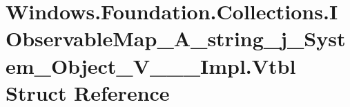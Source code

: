 \hypertarget{struct_windows_1_1_foundation_1_1_collections_1_1_i_observable_map___a__string__j___system___object___v_______impl_1_1_vtbl}{}\section{Windows.\+Foundation.\+Collections.\+I\+Observable\+Map\+\_\+\+A\+\_\+string\+\_\+j\+\_\+\+System\+\_\+\+Object\+\_\+\+V\+\_\+\+\_\+\+\_\+\+Impl.\+Vtbl Struct Reference}
\label{struct_windows_1_1_foundation_1_1_collections_1_1_i_observable_map___a__string__j___system___object___v_______impl_1_1_vtbl}
